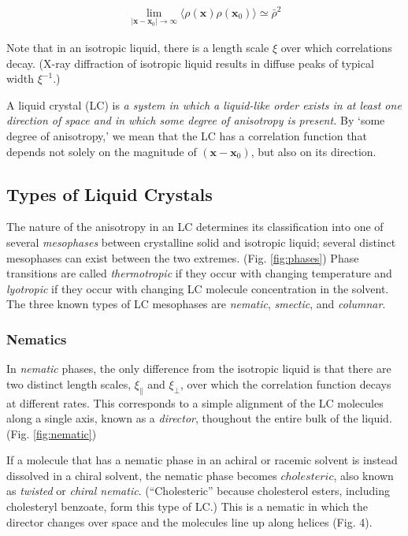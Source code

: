 \documentclass[twocolumn,aps,prl]{revtex4-1} %
\begin{document}
\begin{equation*}
\begin{split}
    \lim_{|\mathbf{x}-\mathbf{x}_0|\to \infty} \langle\rho(\mathbf{x})\rho(\mathbf{x}_0)\rangle \simeq \bar{\rho}^2
\end{split}
\end{equation*}

\noindent Note that in an isotropic liquid, there is a length scale $\xi$ over which correlations decay.  (X-ray diffraction of isotropic liquid results in diffuse peaks of typical width $\xi^{-1}$.)

A liquid crystal (LC) is \textit{a system in which a liquid-like order exists in at least one direction of space and in which some degree of anisotropy is present.}\citep{gennes_physics_1974}  By `some degree of anisotropy,' we mean that the LC has a correlation function that depends not solely on the magnitude of $(\mathbf{x} - \mathbf{x}_0)$, but also on its direction.



\subsection{Types of Liquid Crystals}

The nature of the anisotropy in an LC determines its classification into one of several \textit{mesophases} between crystalline solid and isotropic liquid; several distinct mesophases can exist between the two extremes. (Fig. \ref{fig:phases}) Phase transitions are called \textit{thermotropic} if they occur with changing temperature and \textit{lyotropic} if they occur with changing LC molecule concentration in the solvent.  The three known types of LC mesophases are \textit{nematic}, \textit{smectic}, and \textit{columnar}.

\subsubsection{Nematics}

In \textit{nematic} phases, the only difference from the isotropic liquid is that there are two distinct length scales, $\xi_\parallel$ and $\xi_\perp$, over which the correlation function decays at different rates.  This corresponds to a simple alignment of the LC molecules along a single axis, known as a \textit{director}, thoughout the entire bulk of the liquid. (Fig. \ref{fig:nematic})

If a molecule that has a nematic phase in an achiral or racemic solvent is instead dissolved in a chiral solvent, the nematic phase becomes $cholesteric$, also known as \textit{twisted} or \textit{chiral nematic}.  (``Cholesteric'' because cholesterol esters, including cholesteryl benzoate, form this type of LC.)  This is a nematic in which the director changes over space and the molecules line up along helices (Fig. 4).
\end{document}
